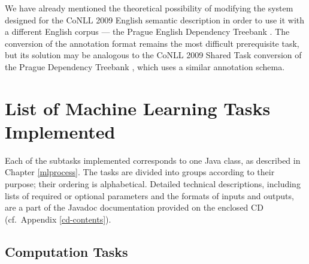 \documentclass[12pt,notitlepage,a4paper]{report}
\begin{document}
We have already mentioned the theoretical possibility of modifying the system designed for the CoNLL 2009 English semantic description in order to use it with a different English corpus --- the Prague English Dependency Treebank \citep{cinkova09}. The conversion of the annotation format remains the most difficult prerequisite task, but its solution may be analogous to the CoNLL 2009 Shared Task conversion of the Prague Dependency Treebank \citep{hajic06,hajic09}, which uses a similar annotation schema.

\cleardoublepage
{}
\printnomenclature[2cm]
\cleardoublepage



\cleardoublepage
\appendix

\chapter{List of Machine Learning Tasks Implemented}\label{tasks-list}

Each of the subtasks implemented corresponds to one Java class, as described in Chapter \ref{mlprocess}. The tasks are divided into groups according to their purpose; their ordering is alphabetical. Detailed technical descriptions, including lists of required or optional parameters and the formats of inputs and outputs, are a part of the Javadoc documentation provided on the enclosed CD (cf.\ Appendix \ref{cd-contents}).

\section*{Computation Tasks}
\end{document}
